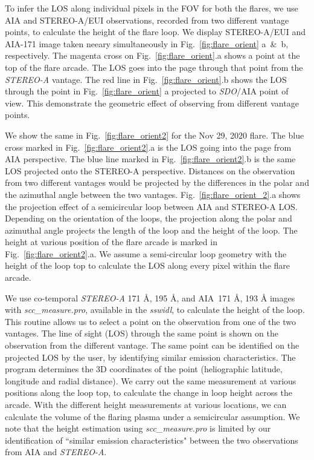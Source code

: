 To infer the LOS along individual pixels in the FOV for both the flares, we use AIA and STEREO-A/EUI observations, recorded from two different vantage points, to calculate the height of the flare loop. We display STEREO-A/EUI and AIA-171 image taken neeary simultaneously in Fig.~\ref{fig:flare_orient} a~\&~b, respectively. The magenta cross on Fig.~\ref{fig:flare_orient}.a shows a point at the top of the flare arcade. The LOS goes into the page through that point from the {\it STEREO-A} vantage. The red line in Fig.~\ref{fig:flare_orient}.b shows the LOS through the point in Fig.~\ref{fig:flare_orient} a projected to {\it SDO}/AIA point of view. This demonstrate the geometric effect of observing from different vantage points. 

We show the same in Fig.~\ref{fig:flare_orient2} for the Nov 29, 2020 flare. The blue cross marked in Fig.~\ref{fig:flare_orient2}.a is the LOS going into the page from AIA perspective. The blue line marked in Fig.~\ref{fig:flare_orient2}.b is the same LOS projected onto the STEREO-A perspective. Distances on the observation from two different vantages would be projected by the differences in the polar and the azimuthal angle between the two vantages. Fig.~\ref{fig:flare_orient_2}.a shows the projection effect of a semicircular loop between AIA and STEREO-A LOS. Depending on the orientation of the loops, the projection along the polar and azimuthal angle projects the length of the loop and the height of the loop. The height at various position of the flare arcade is marked in Fig.~\ref{fig:flare_orient2}.a. We assume a semi-circular loop geometry with the height of the loop top to calculate the LOS along every pixel within the flare arcade.

We use co-temporal {\it STEREO-A} 171 {\AA}, 195 {\AA}, and AIA~171 {\AA}, 193 {\AA} images with \textit{scc\_measure.pro}, available in the \textit{sswidl}, to calculate the height of the loop. This routine allows us to select a point on the observation from one of the two vantages. The line of sight (LOS) through the same point is shown on the observation from the different vantage. The same point can be identified on the projected LOS by the user, by identifying similar emission characteristics. The program determines the 3D coordinates of the point (heliographic latitude, longitude and radial distance). We carry out the same measurement at various positions along the loop top, to calculate the change in loop height across the arcade. With the different height measurements at various locations, we can calculate the volume of the flaring plasma under a semicircular assumption. We note that the height estimation using \textit{scc\_measure.pro} is limited by our identification of ``similar emission characteristics" between the two observations from AIA and {\it STEREO-A}. 

